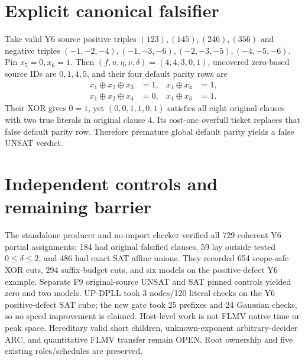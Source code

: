 \documentclass[11pt]{article}
\begin{document}
\section{Explicit canonical falsifier}
Take valid Y6 source positive triples $(123),(145),(246),(356)$ and negative triples $(-1,-2,-4),(-1,-3,-6),(-2,-3,-5),(-4,-5,-6)$. Pin $x_5=0,x_6=1$. Then $(f,u,\eta,\nu,\delta)=(4,4,3,0,1)$, uncovered zero-based source IDs are $0,1,4,5$, and their four default parity rows are
\[
\begin{aligned}
x_1\oplus x_2\oplus x_3&=1, &
x_1\oplus x_4&=1,\\
x_1\oplus x_2\oplus x_4&=0, &
x_1\oplus x_3&=1.
\end{aligned}
\]
Their XOR gives $0=1$, yet $(0,0,1,1,0,1)$ satisfies all eight original clauses with two true literals in original clause 4. Its cost-one overfull ticket replaces that false default parity row. Therefore premature global default parity yields a false UNSAT verdict.
\section{Independent controls and remaining barrier}
The standalone producer and no-import checker verified all 729 coherent Y6 partial assignments: 184 had original falsified clauses, 59 lay outside tested $0\le\delta\le2$, and 486 had exact SAT affine unions. They recorded 654 scope-safe XOR cuts, 294 suffix-budget cuts, and six models on the positive-defect Y6 example. Separate F9 original-source UNSAT and SAT pinned controls yielded zero and two models. UP-DPLL took 3 nodes/120 literal checks on the Y6 positive-defect SAT cube; the new gate took 25 prefixes and 24 Gaussian checks, so no speed improvement is claimed. Host-level work is not FLMV native time or peak space. Hereditary valid short children, unknown-exponent arbitrary-decider ARC, and quantitative FLMV transfer remain OPEN. Root ownership and five existing roles/schedules are preserved.
\end{document}
